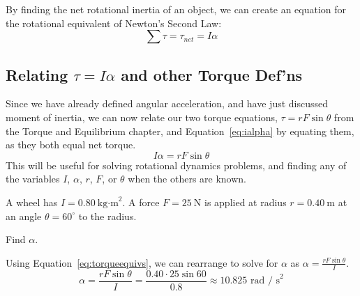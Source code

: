By finding the net rotational inertia of an object, we can create an equation for the rotational equivalent of Newton's Second Law:
\begin{equation}
    \sum \tau = \tau_{net} = I \alpha
    \label{eq:ialpha}
\end{equation}

\subsection{Relating $\tau = I \alpha$ and other Torque Def'ns}
Since we have already defined angular acceleration, and have just discussed moment of inertia, we can now relate our two torque equations, $\tau = rF\sin\theta$ from the Torque and Equilibrium chapter, and Equation~\ref{eq:ialpha} by equating them, as they both equal net torque.
\begin{equation}
  I \alpha = r F \sin\theta
  \label{eq:torqueequivs}
\end{equation}
This will be useful for solving rotational dynamics problems, and finding any of the variables $I$, $\alpha$, $r$, $F$, or $\theta$ when the others are known.
\begin{Exercise}[title=Angular Acceleration of a Wheel,label=angacc1]
A wheel has \(I=0.80\ \text{kg·m}^2\). A force \(F=25\ \text{N}\) is applied at radius \(r=0.40\ \text{m}\) at an angle \(\theta=60^\circ\) to the radius.

Find \(\alpha\).

\end{Exercise}
\begin{Answer}[ref=angacc1]
Using Equation~\ref{eq:torqueequivs}, we can rearrange to solve for $\alpha$ as $\alpha = \frac{r F \sin\theta}{I}$.
\[
\alpha = \frac{r F \sin\theta}{I} = \frac{0.40 \cdot 25 \sin60}{0.8} \approx 10.825 \text{ rad / s}^2
\]

\end{Answer}


